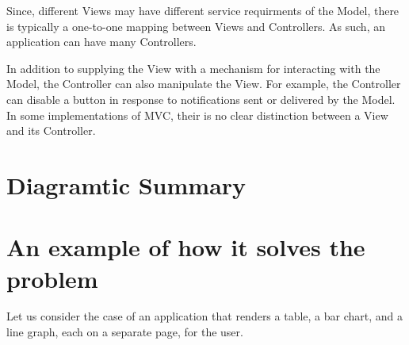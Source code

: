 Since, different Views may have different service requirments of the Model, there is typically a one-to-one mapping between Views and Controllers. As such, an application can have many Controllers. 

In addition to supplying the View with a mechanism for interacting with the Model, the Controller can also manipulate the View. For example, the Controller can disable a button in response to notifications sent or delivered by the Model. In some implementations of MVC, their is no clear distinction between a View and its Controller. 

\section{Diagramtic Summary}

\begin{center}



\end{center}


\section{An example of how it solves the problem}


Let us consider the case of an application that renders a table, a bar chart, and a line graph, each on a separate page, for the user. 


